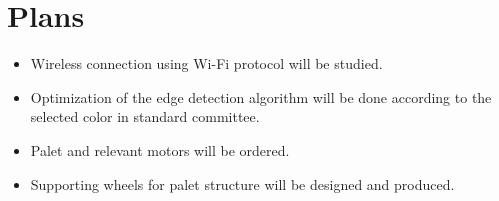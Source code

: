 \documentclass[a4paper,12pt]{article}
\begin{document}
\section{Plans}

	\begin{itemize}
		\item Wireless connection using Wi-Fi protocol will be studied.
		\item Optimization of the edge detection algorithm will be done according to the selected color in standard committee.
		\item Palet and relevant motors will be ordered.
		\item Supporting wheels for palet structure will be designed and produced.
		
	\end{itemize}
\end{document}
